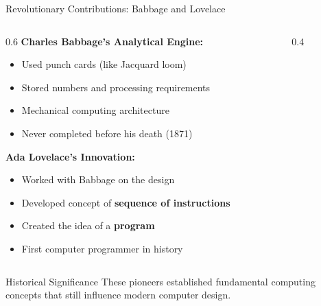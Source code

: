 \documentclass[aspectratio=169]{beamer}
\begin{document}
\begin{frame}{Revolutionary Contributions: Babbage and Lovelace}
    \begin{columns}
        \begin{column}{0.6\textwidth}
            \textbf{Charles Babbage's Analytical Engine:}
            \begin{itemize}
                \item Used punch cards (like Jacquard loom)
                \item Stored numbers and processing requirements
                \item Mechanical computing architecture
                \item Never completed before his death (1871)
            \end{itemize}
            
            \vspace{0.3cm}
            \textbf{Ada Lovelace's Innovation:}
            \begin{itemize}
                \item Worked with Babbage on the design
                \item Developed concept of \textbf{sequence of instructions}
                \item Created the idea of a \textbf{program}
                \item First computer programmer in history
            \end{itemize}
        \end{column}
        \begin{column}{0.4\textwidth}
        \end{column}
    \end{columns}
    
    \begin{alertblock}{Historical Significance}
        These pioneers established fundamental computing concepts that still influence modern computer design.
    \end{alertblock}
\end{frame}
\end{document}
